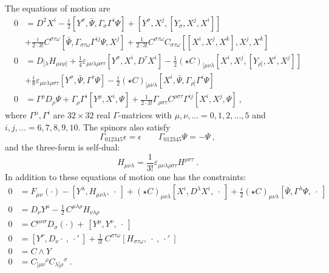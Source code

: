 \documentclass[12pt]{article}
\newcommand{\nn}{\nonumber}
\numberwithin{equation}{section}
\begin{document}
The  equations of motion are
 \begin{align}\label{eomfixed}
  0&=D^2 X^i-\frac{i}{2}[Y^\sigma,\bar \Psi,\Gamma_\sigma\Gamma^i\Psi]+[Y^\sigma,X^j,[Y_\sigma,X^j,X^i]]\nonumber\\&+\frac{i}{2\cdot3!}C^{\sigma\tau\omega}[\bar \Psi,\Gamma_{\sigma\tau\omega}\Gamma^{ij}\Psi,X^j]+\frac{1}{2\cdot 3! } C^{\sigma\tau\omega}C_{\sigma\tau\omega}[[X^i,X^j,X^k],X^j,X^k]\nonumber\\
 0 &= D_{[\lambda}H_{\mu\nu\rho]}+  \frac{1}{4}\varepsilon_{\mu\nu\lambda\rho\sigma\tau}[Y^\sigma,X^i,D^\tau X^i]- \frac{1}{2}(\star C)_{[\mu\nu\lambda}[X^i,X^j,[Y_{\rho]},X^i,X^j]]\nonumber\\
  &  + \frac{i}{8}\varepsilon_{\mu\nu\lambda\rho\sigma\tau}[Y^\sigma,\bar\Psi,\Gamma^{\tau}\Psi] - \frac{i}{2} (\star C)_{[\mu\nu\lambda}[X^i,\bar\Psi,\Gamma_{\rho]}\Gamma^i\Psi]\nonumber \\
 0&= \Gamma^\rho D_\rho\Psi + \Gamma_\rho\Gamma^i[Y^\rho,X^i,\Psi] + \frac{1}{2\cdot3!}\Gamma_{\rho\sigma\tau}C^{\rho\sigma\tau}\Gamma^{ij}[X^i,X^j,\Psi]\ ,
 \end{align}
 where $\Gamma^\mu,\Gamma^i$ are $32\times 32$ real $\Gamma$-matrices with $\mu,\nu,...=0,1,2,...,5$ and $i,j,...=6,7,8,9,10$. The spinors also satisfy
\begin{equation}
\Gamma_{012345}\epsilon = \epsilon\qquad \Gamma_{012345}\Psi = -\Psi\ ,
\end{equation}
and the three-form is self-dual:
\begin{equation}
H_{\mu\nu\lambda} = \frac{1}{3!}\varepsilon_{\mu\nu\lambda\rho\sigma\tau}H^{\rho\sigma\tau}\ .
\end{equation}
In addition to these equations of motion one has the constraints:
 \begin{align}\label{Constraintsfixed}
 0&= F_{\mu\nu}(\cdot) -[Y^\lambda,H_{\mu\nu\lambda},\ \cdot\ ] +(\star C)_{\mu\nu\lambda}[X^i,D^\lambda X^i, \ \cdot\ ] + \frac{i}{2}(\star C)_{\mu\nu\lambda}[\bar\Psi,\Gamma^\lambda\Psi, \ \cdot\ ]\nonumber\\
    0&=D_\nu Y^\mu-\frac{1}{2} \,C^{\mu\lambda\rho}H_{\nu\lambda\rho}\nonumber\\
    0&=C^{\mu\nu\sigma}D_\sigma (\cdot)+\,[Y^\mu,Y^\nu,\ \cdot\ ]\nonumber\\
      0&=[Y^\nu,D_\nu \cdot\ ,\ \cdot'\ ]+\frac{1}{3!}\,C^{\sigma\tau\omega}[H_{\sigma\tau\omega},\ \cdot\ ,\ \cdot'\ ]\nonumber\\
      0&=C\wedge Y\nn\\
      0 &= C_{[\mu\nu}{}^\rho C_{\lambda]\rho}{}^\sigma\ .
 \end{align}
\end{document}
